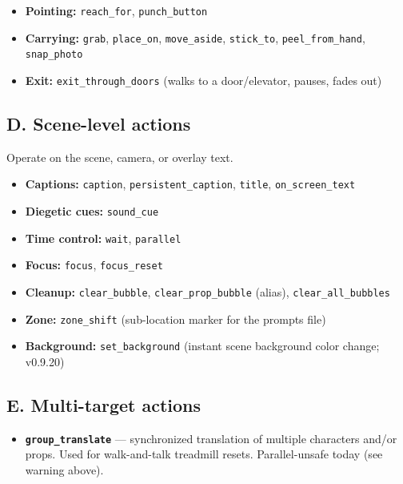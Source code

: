 \documentclass[
  12pt,
  letterpaper,
]{book}
\providecommand{\tightlist}{%
  \setlength{\itemsep}{0pt}\setlength{\parskip}{0pt}}
\begin{document}
\begin{itemize}
\tightlist
\item
  \textbf{Pointing:} \texttt{reach\_for}, \texttt{punch\_button}
\item
  \textbf{Carrying:} \texttt{grab}, \texttt{place\_on},
  \texttt{move\_aside}, \texttt{stick\_to}, \texttt{peel\_from\_hand},
  \texttt{snap\_photo}
\item
  \textbf{Exit:} \texttt{exit\_through\_doors} (walks to a
  door/elevator, pauses, fades out)
\end{itemize}

\subsection{D. Scene-level actions}\label{d.-scene-level-actions}

Operate on the scene, camera, or overlay text.

\begin{itemize}
\tightlist
\item
  \textbf{Captions:} \texttt{caption}, \texttt{persistent\_caption},
  \texttt{title}, \texttt{on\_screen\_text}
\item
  \textbf{Diegetic cues:} \texttt{sound\_cue}
\item
  \textbf{Time control:} \texttt{wait}, \texttt{parallel}
\item
  \textbf{Focus:} \texttt{focus}, \texttt{focus\_reset}
\item
  \textbf{Cleanup:} \texttt{clear\_bubble}, \texttt{clear\_prop\_bubble}
  (alias), \texttt{clear\_all\_bubbles}
\item
  \textbf{Zone:} \texttt{zone\_shift} (sub-location marker for the
  prompts file)
\item
  \textbf{Background:} \texttt{set\_background} (instant scene
  background color change; v0.9.20)
\end{itemize}

\subsection{E. Multi-target actions}\label{e.-multi-target-actions}

\begin{itemize}
\tightlist
\item
  \textbf{\texttt{group\_translate}} --- synchronized translation of
  multiple characters and/or props. Used for walk-and-talk treadmill
  resets. Parallel-unsafe today (see warning above).
\end{itemize}
\end{document}
